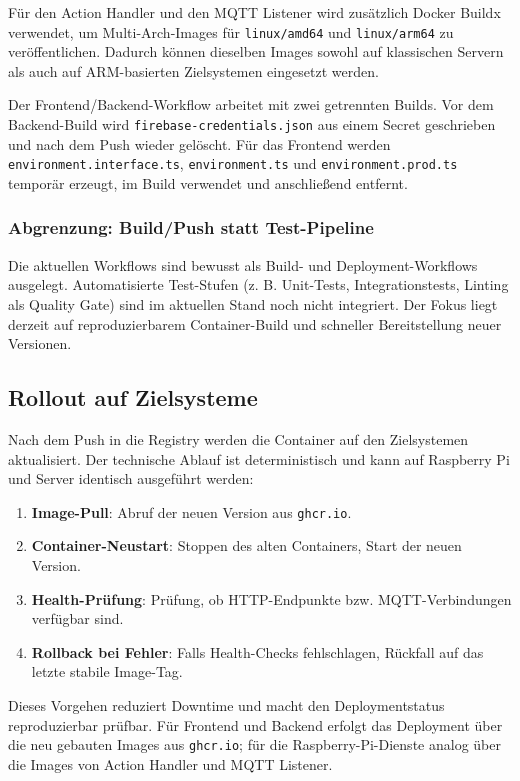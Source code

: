Für den Action Handler und den MQTT Listener wird zusätzlich Docker Buildx verwendet, um Multi-Arch-Images für \texttt{linux/amd64} und \texttt{linux/arm64} zu veröffentlichen. Dadurch können dieselben Images sowohl auf klassischen Servern als auch auf ARM-basierten Zielsystemen eingesetzt werden.

Der Frontend/Backend-Workflow arbeitet mit zwei getrennten Builds. Vor dem Backend-Build wird \texttt{firebase-credentials.json} aus einem Secret geschrieben und nach dem Push wieder gelöscht. Für das Frontend werden \texttt{environment.interface.ts}, \texttt{environment.ts} und \texttt{environment.prod.ts} temporär erzeugt, im Build verwendet und anschließend entfernt.

\subsubsection{Abgrenzung: Build/Push statt Test-Pipeline}

Die aktuellen Workflows sind bewusst als Build- und Deployment-Workflows ausgelegt. Automatisierte Test-Stufen (z. B. Unit-Tests, Integrationstests, Linting als Quality Gate) sind im aktuellen Stand noch nicht integriert. Der Fokus liegt derzeit auf reproduzierbarem Container-Build und schneller Bereitstellung neuer Versionen.

\subsection{Rollout auf Zielsysteme}

Nach dem Push in die Registry werden die Container auf den Zielsystemen aktualisiert. Der technische Ablauf ist deterministisch und kann auf Raspberry Pi und Server identisch ausgeführt werden:

\begin{enumerate}
    \item \textbf{Image-Pull}: Abruf der neuen Version aus \texttt{ghcr.io}.
    \item \textbf{Container-Neustart}: Stoppen des alten Containers, Start der neuen Version.
    \item \textbf{Health-Prüfung}: Prüfung, ob HTTP-Endpunkte bzw. MQTT-Verbindungen verfügbar sind.
    \item \textbf{Rollback bei Fehler}: Falls Health-Checks fehlschlagen, Rückfall auf das letzte stabile Image-Tag.
\end{enumerate}

Dieses Vorgehen reduziert Downtime und macht den Deploymentstatus reproduzierbar prüfbar. Für Frontend und Backend erfolgt das Deployment über die neu gebauten Images aus \texttt{ghcr.io}; für die Raspberry-Pi-Dienste analog über die Images von Action Handler und MQTT Listener.

